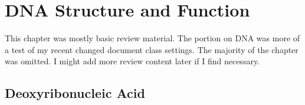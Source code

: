 \documentclass{inVerba-notes}
\begin{document}
\hypertarget{ToC}{\tableofcontents}

\chapter{DNA Structure and Function}\label{DNA Structure and Function}
\begin{adjustwidth}{1cm}{1cm}
  This chapter was mostly basic review material. The portion on DNA was more of a test of my recent changed document class settings. The majority of the chapter was omitted. I might add more review content later if I find necessary.
\end{adjustwidth}

\section{Deoxyribonucleic Acid}\label{Deoxyribonucleic Acid}
\end{document}
